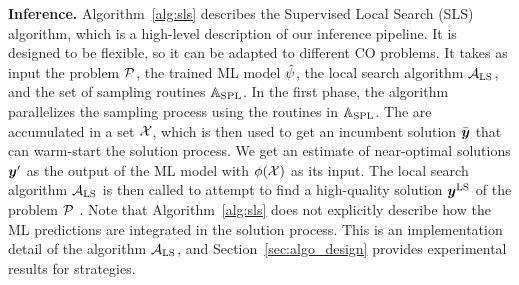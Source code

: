 \documentclass[3p, authoryear, times, doubleblind]{elsarticle}
\begin{document}
{%




\textbf{Inference. } Algorithm~\ref{alg:sls} describes the Supervised Local Search (SLS) algorithm, which is a high-level description of our inference pipeline. It is designed to be flexible, so it can be adapted to different CO problems. It takes as input the problem $\mathcal{P}$, the trained ML model $\hat{\psi}$, the local search algorithm $\mathcal{A}_{\text{LS}}$, and the set of sampling routines $\mathbb{A}_{\text{SPL}}$. In the first phase, the algorithm parallelizes the sampling process using the routines in $\mathbb{A}_{\text{SPL}}$. The  are accumulated in a set $\mathcal{X}$, which is then used to get an incumbent solution $\bar{\boldsymbol{y}}$ that can warm-start the solution process. We get an estimate of near-optimal solutions $\boldsymbol{y}'$ as the output of the ML model with $\phi(\mathcal{X})$ as its input. The local search algorithm $\mathcal{A}_{\text{LS}}$ is then called to attempt to find a high-quality solution $\boldsymbol{y}^{\text{LS}}$ of the problem $\mathcal{P}$ . Note that Algorithm~\ref{alg:sls} does not explicitly describe  how the ML predictions are integrated in the solution process. This is an implementation detail of the algorithm $\mathcal{A}_{\text{LS}}$, and Section~\ref{sec:algo_design} provides experimental results for  strategies. 

}
\end{document}

